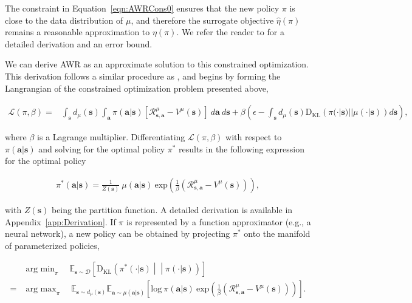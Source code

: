 The constraint in Equation~\ref{eqn:AWRCons0} ensures that the new policy $\pi$ is close to the data distribution of $\mu$, and therefore the surrogate objective  $\hat{\eta}(\pi)$ remains a reasonable approximation to $\eta(\pi)$. We refer the reader to \citet{TRPOschulman15} for a detailed derivation and an error bound.

We can derive AWR as an approximate solution to this constrained optimization. This derivation follows a similar procedure as \citet{Peters2010REP},
and begins by forming the Langrangian of the constrained optimization problem presented above,

\begin{equation}
 \begin{aligned}
     \mathcal{L}(\pi, \beta) = & \int_{\mathbf{s}} d_\mu({\mathbf{s}}) \int_{\mathbf{a}} \pi({\mathbf{a}} | {\mathbf{s}}) \left[\mathcal{R}_{{\mathbf{s}},{\mathbf{a}}}^\mu - V^\mu({\mathbf{s}})\right] \ d{\mathbf{a}} \ d{\mathbf{s}} + \beta \left(\epsilon - \int_{\mathbf{s}} d_\mu({\mathbf{s}}) \mathrm{D_{KL}} \left( \pi(\cdot |{\mathbf{s}}) || \mu(\cdot |{\mathbf{s}}) \right) d{\mathbf{s}} \right) ,

     \label{eqn:AWRLagrangian}
 \end{aligned}
 \end{equation}

where $\beta$ is a Lagrange multiplier. Differentiating $\mathcal{L}(\pi, \beta)$
with respect to $\pi({\mathbf{a}}|{\mathbf{s}})$ and solving for the optimal policy $\pi^*$ results in the following expression for the optimal policy

\begin{equation}
 \begin{aligned}
     \pi^*({\mathbf{a}}|{\mathbf{s}}) = \frac{1}{Z({\mathbf{s}})} \ \mu({\mathbf{a}}|{\mathbf{s}}) \ \mathrm{exp}\left(\frac{1}{\beta}\left( \mathcal{R}_{{\mathbf{s}},{\mathbf{a}}}^\mu - V^\mu({\mathbf{s}}) \right) \right) ,
 \end{aligned}
\end{equation}

with $Z({\mathbf{s}})$ being the partition function. A detailed derivation is available in Appendix~\ref{app:Derivation}. If $\pi$ is represented by a function approximator (e.g., a neural network), a new policy can be obtained by projecting $\pi^*$ onto the manifold of parameterized policies,

\begin{align}
    & \mathop{\mathrm{arg \ min}}_{\pi} \quad \mathbb{E}_{{\mathbf{s}} \sim \mathcal{D}} \left[ \mathrm{D_{KL}} \left(\pi^*(\cdot  | {\mathbf{s}}) \middle|\middle| \pi(\cdot  | {\mathbf{s}})\right) \right]\\
    = & \mathop{\mathrm{arg \ max}}_{\pi} \quad \mathbb{E}_{{\mathbf{s}} \sim d_\mu({\mathbf{s}})} \mathbb{E}_{{\mathbf{a}} \sim \mu({\mathbf{a}}|{\mathbf{s}})} \left[ \mathrm{log} \ \pi({\mathbf{a}} | {\mathbf{s}}) \ \mathrm{exp}\left( \frac{1}{\beta} \left( \mathcal{R}_{{\mathbf{s}},{\mathbf{a}}}^\mu - V^\mu({\mathbf{s}}) \right) \right) \right].
\label{eqn:AWRUpdate}
\end{align}

